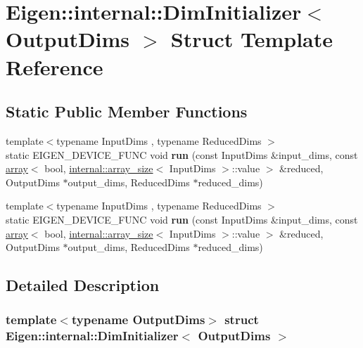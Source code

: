\hypertarget{struct_eigen_1_1internal_1_1_dim_initializer}{}\section{Eigen\+:\+:internal\+:\+:Dim\+Initializer$<$ Output\+Dims $>$ Struct Template Reference}
\label{struct_eigen_1_1internal_1_1_dim_initializer}
\subsection*{Static Public Member Functions}
\begin{DoxyCompactItemize}
\item 
\mbox{\label{struct_eigen_1_1internal_1_1_dim_initializer_af13bde146ea57c860f8defe77167f923}} 
{\footnotesize template$<$typename Input\+Dims , typename Reduced\+Dims $>$ }\\static E\+I\+G\+E\+N\+\_\+\+D\+E\+V\+I\+C\+E\+\_\+\+F\+U\+NC void {\bfseries run} (const Input\+Dims \&input\+\_\+dims, const \hyperlink{class_eigen_1_1array}{array}$<$ bool, \hyperlink{struct_eigen_1_1internal_1_1array__size}{internal\+::array\+\_\+size}$<$ Input\+Dims $>$\+::value $>$ \&reduced, Output\+Dims $\ast$output\+\_\+dims, Reduced\+Dims $\ast$reduced\+\_\+dims)
\item 
\mbox{\label{struct_eigen_1_1internal_1_1_dim_initializer_af13bde146ea57c860f8defe77167f923}} 
{\footnotesize template$<$typename Input\+Dims , typename Reduced\+Dims $>$ }\\static E\+I\+G\+E\+N\+\_\+\+D\+E\+V\+I\+C\+E\+\_\+\+F\+U\+NC void {\bfseries run} (const Input\+Dims \&input\+\_\+dims, const \hyperlink{class_eigen_1_1array}{array}$<$ bool, \hyperlink{struct_eigen_1_1internal_1_1array__size}{internal\+::array\+\_\+size}$<$ Input\+Dims $>$\+::value $>$ \&reduced, Output\+Dims $\ast$output\+\_\+dims, Reduced\+Dims $\ast$reduced\+\_\+dims)
\end{DoxyCompactItemize}


\subsection{Detailed Description}
\subsubsection*{template$<$typename Output\+Dims$>$\newline
struct Eigen\+::internal\+::\+Dim\+Initializer$<$ Output\+Dims $>$}



